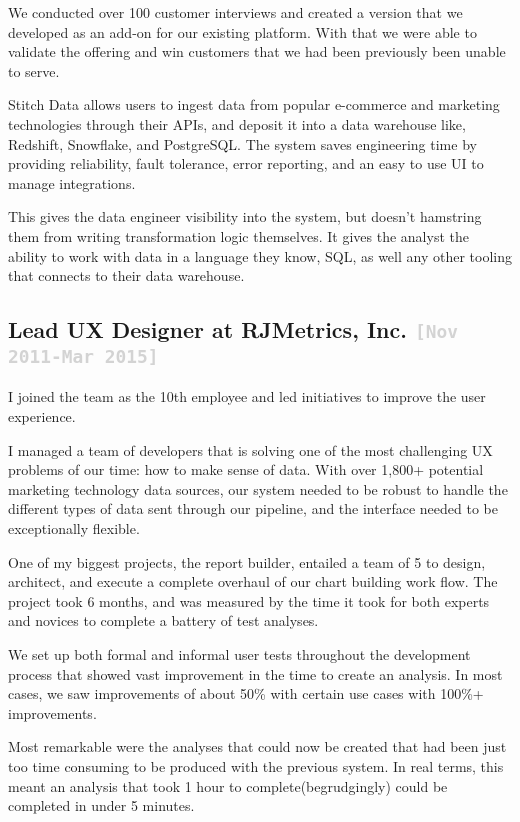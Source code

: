 \documentclass{tufte-handout}
\newcommand{\shstandout}[1]{\textbf{\textcolor{BurntOrange}{#1}}}
\newcommand{\shyears}[1]{\small{\texttt{\textcolor{LightGray}{#1}}}}
\begin{document}
We conducted over 100 customer interviews and created a version that we developed as an add-on for our existing platform. With that we were able to validate the offering and win customers that we had been previously been unable to serve.

Stitch Data allows users to ingest data from popular e-commerce and marketing technologies through their APIs, and deposit it into a data warehouse like, Redshift, Snowflake, and PostgreSQL. The system saves engineering time by providing reliability, fault tolerance, error reporting, and an easy to use UI to manage integrations.

This gives the data engineer visibility into the system, but doesn't hamstring them from writing transformation logic themselves. It gives the analyst the ability to work with data in a language they know, SQL, as well any other tooling that connects to their data warehouse.

\subsection{\textbf{Lead UX Designer} at \shstandout{RJMetrics, Inc.} \shyears{[Nov 2011-Mar 2015]}}

I joined the team as the 10th employee and led initiatives to improve the user experience.

I managed a team of developers that is solving one of the most challenging UX problems of our time: how to make sense of data. With over 1,800+ potential marketing technology data sources, our system needed to be robust to handle the different types of data sent through our pipeline, and the interface needed to be exceptionally flexible.

One of my biggest projects, the report builder, entailed a team of 5 to design, architect, and execute a complete overhaul of our chart building work flow. The project took 6 months, and was measured by the time it took for both experts and novices to complete a battery of test analyses.

We set up both formal and informal user tests throughout the development process that showed vast improvement in the time to create an analysis. In most cases, we saw improvements of about 50\% with certain use cases with 100\%+ improvements.

Most remarkable were the analyses that could now be created that had been just too time consuming to be produced with the previous system. In real terms, this meant an analysis that took 1 hour to complete(begrudgingly) could be completed in under 5 minutes.
\end{document}
